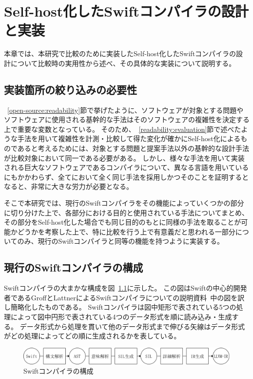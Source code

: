 \chapter{Self-host化したSwiftコンパイラの設計と実装}
\label{refinement}

本章では、本研究で比較のために実装したSelf-host化したSwiftコンパイラの設計について比較時の実用性から述べ、その具体的な実装について説明する。

\section{実装箇所の絞り込みの必要性}
\label{refinement:demand}

~\ref{open-source:readability}節で挙げたように、ソフトウェアが対象とする問題やソフトウェアに使用される基幹的な手法はそのソフトウェアの複雑性を決定する上で重要な変数となっている。
そのため、~\ref{readability:evaluation}節で述べたような手法を用いて複雑性を計測・比較して得た変化が確かにSelf-host化によるものであると考えるためには、対象とする問題と提案手法以外の基幹的な設計手法が比較対象において同一である必要がある。
しかし、様々な手法を用いて実装される巨大なソフトウェアであるコンパイラについて、異なる言語を用いているにもかかわらず、全てにおいて全く同じ手法を採用しかつそのことを証明するとなると、非常に大きな労力が必要となる。

そこで本研究では、現行のSwiftコンパイラをその機能によっていくつかの部分に切り分けた上で、各部分における目的と使用されている手法についてまとめ、その部分をSelf-host化した場合でも同じ目的のもとに同様の手法を取ることが可能かどうかを考察した上で、特に比較を行う上で有意義だと思われる一部分についてのみ、現行のSwiftコンパイラと同等の機能を持つように実装する。

\section{現行のSwiftコンパイラの構成}
\label{refinement:structure}

Swiftコンパイラの大まかな構成を図~\ref{img:swift-compiler-process}に示した。
この図はSwiftの中心的開発者であるGroffとLattnerによるSwiftコンパイラについての説明資料~\cite{sil}中の図を訳し簡略化したものである。
Swiftコンパイラは図中矩形で表されている5つの処理によって図中円形で表されている4つのデータ形式を順に読み込み・生成する。
データ形式から処理を貫いて他のデータ形式まで伸びる矢線はデータ形式がどの処理によってどの順に生成されるかを表している。

\begin{figure}
    \begin{center}
        \includegraphics[scale=0.5]{./img/swift_compiler_process.png}
        \caption{Swiftコンパイラの構成}
        \label{img:swift-compiler-process}
    \end{center}
\end{figure}

